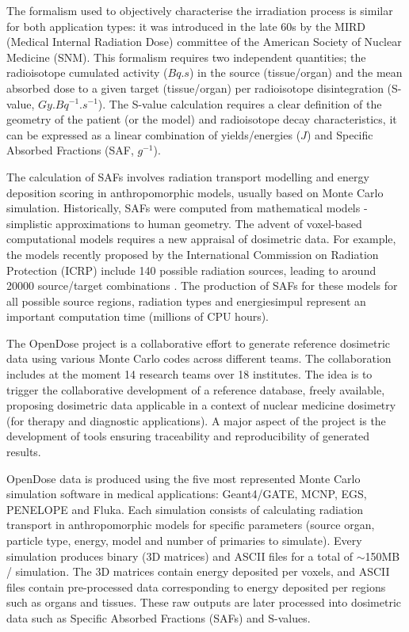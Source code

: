   The formalism used to objectively characterise the irradiation process is
  similar for both application types: it was introduced in the late 60s by the
  MIRD (Medical Internal Radiation Dose) committee of the American Society of
  Nuclear Medicine (SNM). This formalism \cite{loevinger1991mird} requires two
  independent quantities; the radioisotope cumulated activity ($Bq.s$) in the
  source (tissue/organ) and the mean absorbed dose to a given target
  (tissue/organ) per radioisotope disintegration (S-value,
  $Gy.Bq^{-1}.s^{-1}$). The S-value calculation requires a clear definition of
  the geometry of the patient (or the model) and radioisotope decay
  characteristics, it can be expressed as a linear combination of
  yields/energies ($J$) and Specific Absorbed Fractions (SAF, $g^{-1}$).

  The calculation of SAFs involves radiation transport modelling and energy
  deposition scoring in anthropomorphic models, usually based on Monte Carlo
  simulation. Historically, SAFs were computed from mathematical models -
  simplistic approximations to human geometry. The advent of voxel-based
  computational models requires a new appraisal of dosimetric data. For
  example, the models recently proposed by the International Commission on
  Radiation Protection (ICRP) include 140 possible radiation sources, leading
  to around 20000 source/target combinations \cite{ICRP2009ICRPPhantoms}. The
  production of SAFs for these models for all possible source regions,
  radiation types and energiesimpul represent an important computation time
  (millions of CPU hours).

  The OpenDose project \cite{Chauvin2017} is a collaborative effort to generate
  reference dosimetric data using various Monte Carlo codes across different
  teams. The collaboration includes at the moment 14 research teams over 18
  institutes.  The idea is to trigger the collaborative development of a
  reference database, freely available, proposing dosimetric data applicable in
  a context of nuclear medicine dosimetry (for therapy and diagnostic
  applications). A major aspect of the project is the development of tools
  ensuring traceability and reproducibility of generated results.

  OpenDose data is produced using the five most represented Monte Carlo
  simulation software in medical applications: Geant4/GATE, MCNP, EGS, PENELOPE
  and Fluka. Each simulation consists of calculating radiation transport in
  anthropomorphic models for specific parameters (source organ, particle type,
  energy, model and number of primaries to simulate). Every simulation produces
  binary (3D matrices) and ASCII files for a total of $\sim$150MB / simulation.
  The 3D matrices contain energy deposited per voxels, and ASCII files contain
  pre-processed data corresponding to energy deposited per regions such as
  organs and tissues. These raw outputs are later processed into dosimetric
  data such as Specific Absorbed Fractions (SAFs) and S-values.

